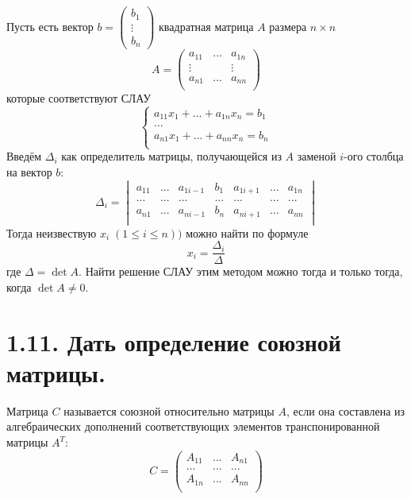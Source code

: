 \documentclass{article}
\begin{document}
Пусть есть вектор $b = \begin{pmatrix} b_1 \\ \vdots \\ b_n \end{pmatrix}$ квадратная матрица $A$ размера $n \times n$
$$
A = 
\begin{pmatrix}
a_{11} & ... & a_{1n} \\
\vdots &  & \vdots \\
a_{n1} & ... & a_{nn} \\
\end{pmatrix}
$$
которые соответствуют СЛАУ
$$
\begin{cases}
a_{11}x_1 + ... + a_{1n}x_n = b_1 \\
... \\
a_{n1}x_1 + ... + a_{nn}x_n = b_n \\
\end{cases}
$$
Введём $\Delta_i$ как определитель матрицы, получающейся из $A$ заменой $i$-ого столбца на вектор $b$:
$$
\Delta_i = 
\begin{vmatrix}
a_{11} & ... & a_{1i-1} & b_1 & a_{1i+1} & ... & a_{1n} \\
... & ... & ... & ... & ... & ... & ... \\
a_{n1} & ... & a_{ni-1} & b_n & a_{ni+1} & ... & a_{nn} \\
\end{vmatrix}
$$
Тогда неизвествую $x_i \; (1 \le i \le n))$ можно найти по формуле
$$
x_i = \frac{\Delta_i}{\Delta}
$$
где $\Delta = \det{A}$.
\newline Найти решение СЛАУ этим методом можно тогда и только тогда, когда 
\newline $\det{A} \ne 0$.

\section*{\LARGE 1.11. Дать определение союзной матрицы.  }

Матрица $C$ называется союзной относительно матрицы $A$, если она составлена из алгебраических дополнений соответствующих элементов транспонированной матрицы $A^T$:
$$
C = 
\begin{pmatrix}
A_{11} & ... & A_{n1} \\
... & ... & ... \\
A_{1n} & ... & A_{nn} \\
\end{pmatrix}
$$
\end{document}
